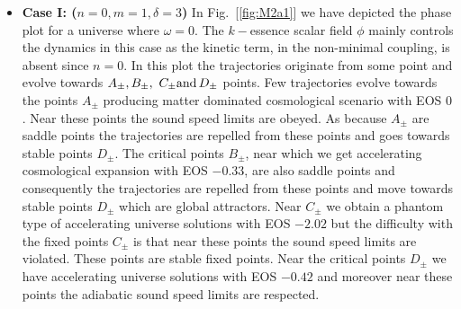 \documentclass[a4paper,12pt]{article}
\begin{document}
\begin{itemize}
\item {\textbf{{Case I: ($n=0, m=1,\delta = 3$)}}}\; In Fig.~[\ref{fig:M2a1}] we have depicted the phase plot for a universe where $\omega=0$. The $k-$essence scalar field $\phi$ mainly controls the dynamics in this case as the kinetic term, in the non-minimal coupling, is absent since $n=0$. In this plot the trajectories originate from some point and evolve towards $A_{\pm}, B_{\pm},\  C_{\pm} {\rm and} \, D_{\pm}$ points. Few trajectories evolve towards the points $A_{\pm}$ producing matter dominated cosmological scenario with EOS $0$. Near these points the sound speed limits are obeyed.  As because $A_{\pm}$  are saddle points the trajectories are repelled from these points and goes towards stable points $D_{\pm}$. The critical points $B_{\pm}$, near which we get accelerating cosmological expansion with EOS $-0.33$, are also saddle points and consequently the trajectories are repelled from these points and move towards stable points $D_{\pm}$ which are global attractors.  Near $C_{\pm}$ we obtain a phantom type of accelerating universe solutions with EOS $-2.02$ but the difficulty with the fixed points $C_{\pm}$ is that near these points the sound speed limits are violated. These points are stable fixed points. Near the critical points $D_{\pm}$ we have accelerating universe solutions with EOS $-0.42$ and moreover near these points the adiabatic sound speed limits are respected.


\end{itemize}
\end{document}
